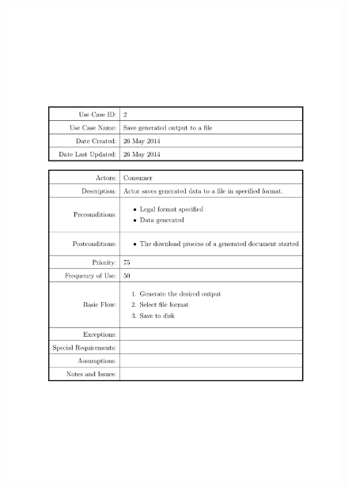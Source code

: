 \documentclass{tufte-book}
\begin{document}
\begin{figure}[h] \includegraphics[width=\linewidth]{Requirements/UseCases/002_SaveOutput2File.pdf}\end{figure}
\end{document}
